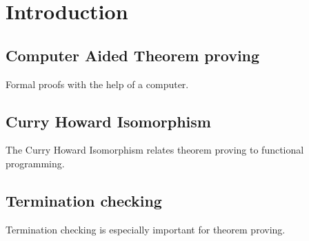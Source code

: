 \chapter{Introduction}

\section {Computer Aided Theorem proving}
Formal proofs with the help of a computer.
\section {Curry Howard Isomorphism}
The Curry Howard Isomorphism relates theorem proving to functional programming.
\section {Termination checking}
Termination checking is especially important for theorem proving.


